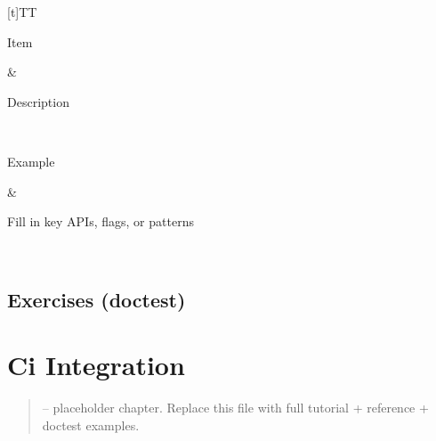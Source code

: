 \documentclass[a4paper,11pt,english]{sphinxmanual}
\begin{document}
\begin{savenotes}\sphinxattablestart
\sphinxthistablewithglobalstyle
\centering
\begin{tabulary}{\linewidth}[t]{TT}
\sphinxtoprule
\begin{varwidth}[t]{}
\sphinxstyletheadfamily \sphinxAtStartPar
Item
\sphinxbeforeendvarwidth
\end{varwidth}%
&\begin{varwidth}[t]{}
\sphinxstyletheadfamily \sphinxAtStartPar
Description
\sphinxbeforeendvarwidth
\end{varwidth}%
\\
\sphinxmidrule
\sphinxtableatstartofbodyhook\begin{varwidth}[t]{}
\sphinxAtStartPar
Example
\sphinxbeforeendvarwidth
\end{varwidth}%
&\begin{varwidth}[t]{}
\sphinxAtStartPar
Fill in key APIs, flags, or patterns
\sphinxbeforeendvarwidth
\end{varwidth}%
\\
\sphinxbottomrule
\end{tabulary}
\sphinxtableafterendhook\par
\sphinxattableend\end{savenotes}


\subsection{Exercises (doctest)}
\label{\detokenize{typing/advanced:exercises-doctest}}
\begin{sphinxVerbatim}[commandchars=\\\{\}]
\end{sphinxVerbatim}

\sphinxstepscope


\section{Ci Integration}
\label{\detokenize{typing/ci_integration:ci-integration}}\label{\detokenize{typing/ci_integration::doc}}\begin{quote}

\sphinxAtStartPar
{} – placeholder chapter. Replace this file with full tutorial + reference + doctest examples.
\end{quote}
\end{document}
